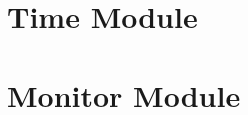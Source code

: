 \documentclass[letterpaper,10pt,english]{sphinxmanual}
\begin{document}
\begin{fulllineitems}

\pysigstartsignatures
{}
\pysigstopsignatures
\end{fulllineitems}



\begin{fulllineitems}

\pysigstartsignatures
{}
\pysigstopsignatures
\end{fulllineitems}


\sphinxstepscope


\section{Time Module}
\label{\detokenize{time:time-module}}\label{\detokenize{time::doc}}

\begin{fulllineitems}

\pysigstartsignatures
{}
\pysigstopsignatures
\end{fulllineitems}



\begin{fulllineitems}

\pysigstartsignatures
{}
\pysigstopsignatures
\end{fulllineitems}


\sphinxstepscope


\section{Monitor Module}
\label{\detokenize{monitor:monitor-module}}\label{\detokenize{monitor::doc}}

\begin{fulllineitems}

\pysigstartsignatures
{}
\pysigstopsignatures
\end{fulllineitems}
\end{document}
